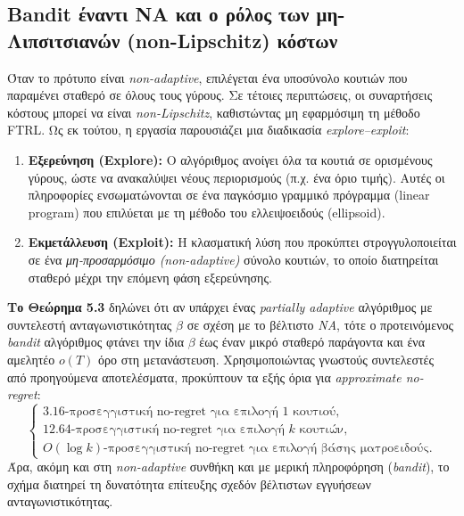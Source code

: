 \documentclass[11pt,a4paper]{article}
\begin{document}
\subsection*{Bandit έναντι NA και ο ρόλος των μη-Λιπσιτσιανών (non-Lipschitz) κόστων}
Όταν το πρότυπο είναι \textit{non-adaptive}, επιλέγεται ένα υποσύνολο κουτιών που παραμένει σταθερό σε όλους τους γύρους. Σε τέτοιες περιπτώσεις, οι συναρτήσεις κόστους μπορεί να είναι \textit{non-Lipschitz}, καθιστώντας μη εφαρμόσιμη τη μέθοδο FTRL. Ως εκ τούτου, η εργασία παρουσιάζει μια διαδικασία \textit{explore--exploit}:
\begin{enumerate}
\item \textbf{Εξερεύνηση (Explore):} Ο αλγόριθμος ανοίγει όλα τα κουτιά σε ορισμένους γύρους, ώστε να ανακαλύψει νέους περιορισμούς (π.χ. ένα όριο τιμής). Αυτές οι πληροφορίες ενσωματώνονται σε ένα παγκόσμιο γραμμικό πρόγραμμα (linear program) που επιλύεται με τη μέθοδο του ελλειψοειδούς (ellipsoid).
\item \textbf{Εκμετάλλευση (Exploit):} Η κλασματική λύση που προκύπτει στρογγυλοποιείται σε ένα \textit{μη-προσαρμόσιμο (non-adaptive)} σύνολο κουτιών, το οποίο διατηρείται σταθερό μέχρι την επόμενη φάση εξερεύνησης.
\end{enumerate}
\textbf{Το Θεώρημα 5.3} δηλώνει ότι αν υπάρχει ένας \textit{partially adaptive} αλγόριθμος με συντελεστή ανταγωνιστικότητας $\beta$ σε σχέση με το βέλτιστο \textit{NA}, τότε ο προτεινόμενος \textit{bandit} αλγόριθμος φτάνει την ίδια $\beta$ έως έναν μικρό σταθερό παράγοντα και ένα αμελητέο \(o(T)\) όρο στη μετανάστευση. Χρησιμοποιώντας γνωστούς συντελεστές από προηγούμενα αποτελέσματα, προκύπτουν τα εξής όρια για \textit{approximate no-regret}:
\[
\begin{cases}
3.16\text{-προσεγγιστική no-regret για επιλογή 1 κουτιού},\\
12.64\text{-προσεγγιστική no-regret για επιλογή $k$ κουτιών},\\
O(\log k)\text{-προσεγγιστική no-regret για επιλογή βάσης ματροειδούς}.
\end{cases}
\]
Άρα, ακόμη και στη \textit{non-adaptive} συνθήκη και με μερική πληροφόρηση (\textit{bandit}), το σχήμα διατηρεί τη δυνατότητα επίτευξης σχεδόν βέλτιστων εγγυήσεων ανταγωνιστικότητας.
\end{document}

